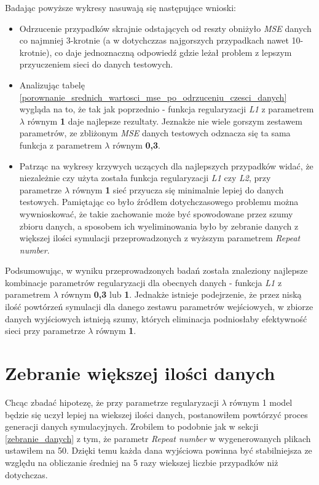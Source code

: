 \documentclass[12pt]{aghdpl}
\begin{document}
		Badając powyższe wykresy nasuwają się następujące wnioski:
		\begin{itemize}
		\item Odrzucenie przypadków skrajnie odstających od reszty obniżyło \textit{MSE} danych co najmniej 3-krotnie (a w dotychczzas najgorszych przypadkach nawet 10-krotnie), co daje jednoznaczną odpowiedź gdzie leżał problem z lepszym przyuczeniem sieci do danych testowych.
		\item Analizując tabelę \ref{porownanie_srednich_wartosci_mse_po_odrzuceniu_czesci_danych} wygląda na to, że tak jak poprzednio - funkcja regularyzacji \textit{L1} z parametrem $\lambda$ równym \textbf{1} daje najlepsze rezultaty. Jeznakże nie wiele gorszym zestawem parametrów, ze zbliżonym \textit{MSE} danych testowych odznacza się ta sama funkcja z parametrem $\lambda$ równym \textbf{0,3}.
		\item Patrząc na wykresy krzywych uczących dla najlepszych przypadków widać, że niezależnie czy użyta została funkcja regularyzacji \textit{L1} czy \textit{L2}, przy parametrze $\lambda$ równym \textbf{1} sieć przyucza się minimalnie lepiej do danych testowych. Pamiętając co było źródłem dotychczasowego problemu można wywnioskować, że takie zachowanie może być spowodowane przez szumy zbioru danych, a sposobem ich wyeliminowania było by zebranie danych z większej ilości symulacji przeprowadzonych z wyższym parametrem \textit{Repeat number}.
		\end{itemize}
		
		Podsumowując, w wyniku przeprowadzonych badań została znaleziony najlepsze kombinacje parametrów regularyzacji dla obecnych danych - funkcja \textit{L1} z parametrem $\lambda$ równym \textbf{0,3} lub \textbf{1}. Jednakże istnieje podejrzenie, że przez niską ilość powtórzeń symulacji dla danego zestawu parametrów wejściowych, w zbiorze danych wyjściowych istnieją szumy, których eliminacja podniosłaby efektywność sieci przy parametrze $\lambda$ równym \textbf{1}.
		
		\section{Zebranie większej ilości danych}	
		Chcąc zbadać hipotezę, że przy parametrze regularyzacji $\lambda$ równym 1 model będzie się uczył lepiej na wiekszej ilości danych, postanowiłem powtórzyć proces generacji danych symulacyjnych. Zrobilem to podobnie jak w sekcji \ref{zebranie_danych} z tym, że parametr \textit{Repeat number} w wygenerowanych plikach ustawiłem na 50. Dzięki temu każda dana wyjściowa powinna być stabilniejsza ze względu na obliczanie średniej na 5 razy wiekszej liczbie przypadków niż dotychczas.
		
\end{document}
